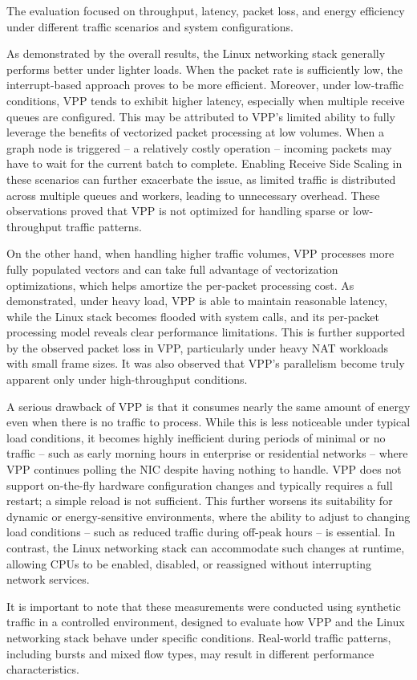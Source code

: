 The evaluation focused on throughput, latency, packet loss, and energy efficiency under different traffic scenarios and system configurations.

As demonstrated by the overall results, the Linux networking stack generally performs better under lighter loads.  
When the packet rate is sufficiently low, the interrupt-based approach proves to be more efficient.
Moreover, under low-traffic conditions, VPP tends to exhibit higher latency, especially when multiple receive queues are configured.  
This may be attributed to VPP’s limited ability to fully leverage the benefits of vectorized packet processing at low volumes.  
When a graph node is triggered -- a relatively costly operation -- incoming packets may have to wait for the current batch to complete.
Enabling Receive Side Scaling in these scenarios can further exacerbate the issue, as limited traffic is distributed across multiple queues and workers, leading to unnecessary overhead.
These observations proved that VPP is not optimized for handling sparse or low-throughput traffic patterns.

On the other hand, when handling higher traffic volumes, VPP processes more fully populated vectors and can take full advantage of vectorization optimizations, 
which helps amortize the per-packet processing cost.
As demonstrated, under heavy load, VPP is able to maintain reasonable latency, while the Linux stack becomes flooded with system calls, 
and its per-packet processing model reveals clear performance limitations.
This is further supported by the observed packet loss in VPP, particularly under heavy NAT workloads with small frame sizes.
It was also observed that VPP’s parallelism become truly apparent only under high-throughput conditions.

A serious drawback of VPP is that it consumes nearly the same amount of energy even when there is no traffic to process.  
While this is less noticeable under typical load conditions, it becomes highly inefficient during periods of minimal or no traffic -- 
such as early morning hours in enterprise or residential networks -- where VPP continues polling the NIC despite having nothing to handle.
VPP does not support on-the-fly hardware configuration changes and typically requires a full restart; a simple reload is not sufficient.  
This further worsens its suitability for dynamic or energy-sensitive environments, where the ability to adjust to changing load conditions -- such as reduced traffic during off-peak hours -- is essential.  
In contrast, the Linux networking stack can accommodate such changes at runtime, allowing CPUs to be enabled, disabled, or reassigned without interrupting network services.

It is important to note that these measurements were conducted using synthetic traffic in a controlled environment, 
designed to evaluate how VPP and the Linux networking stack behave under specific conditions.  
Real-world traffic patterns, including bursts and mixed flow types, may result in different performance characteristics.


